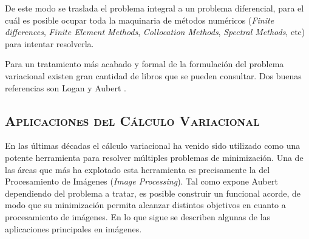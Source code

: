 \documentclass[letter, 11pt]{article}
\begin{document}
De este modo se traslada el problema integral a un problema diferencial, para el cuál es posible ocupar toda la maquinaria de métodos numéricos (\textit{Finite differences}, \textit{Finite Element Methods}, \textit{Collocation Methods}, \textit{Spectral Methods}, etc) para intentar resolverla.

Para un tratamiento más acabado y formal de la formulación del problema variacional existen gran cantidad de libros que se pueden consultar.  Dos buenas referencias son Logan \cite{Logan} y Aubert \cite{Aubert}.   



\subsection{\textsc{Aplicaciones del Cálculo Variacional}}
En las últimas décadas el cálculo variacional ha venido sido utilizado como una potente herramienta para resolver múltiples problemas de minimización. Una de las áreas que más ha explotado esta herramienta es precisamente la del Procesamiento de Imágenes (\textit{Image Processing}). Tal como expone Aubert \cite{Aubert} dependiendo del problema a tratar, es posible construir un funcional acorde, de modo que su minimización permita alcanzar distintos objetivos en cuanto a procesamiento de imágenes. En lo que sigue se describen algunas de las aplicaciones principales en imágenes.
\end{document}
